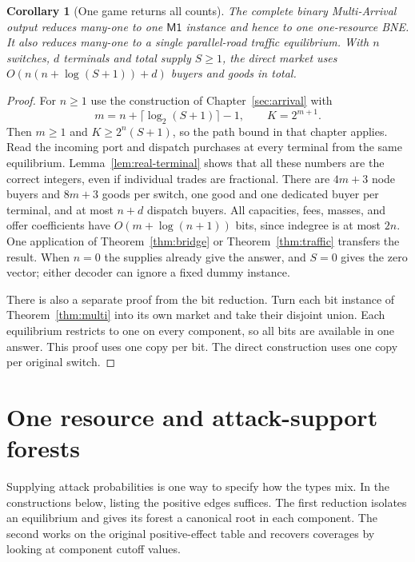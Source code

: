 \documentclass[11pt,oneside,openany,notitlepage]{report}
\newtheorem{corollary}[theorem]{Corollary}
\newcommand{\Market}{\mathsf{M1}}
\begin{document}
\begin{corollary}[One game returns all counts]\label{cor:multi-one}
The complete binary Multi-Arrival output reduces many-one to one
\(\Market\) instance and hence to one one-resource BNE. It also reduces
many-one to a single parallel-road traffic equilibrium. With \(n\)
switches, \(d\) terminals and total supply \(S\ge1\), the direct market
uses \(O(n(n+\log(S+1))+d)\) buyers and goods in total.
\end{corollary}
\begin{proof}
For \(n\ge1\) use the construction of Chapter~\ref{sec:arrival} with
\[
 m=n+\lceil\log_2(S+1)\rceil-1,\qquad K=2^{m+1}.
\]
Then \(m\ge1\) and \(K\ge2^n(S+1)\), so the path bound in that chapter
applies. Read the incoming port and dispatch purchases at every terminal
from the same equilibrium. Lemma~\ref{lem:real-terminal} shows that all
these numbers are the correct integers, even if individual trades are
fractional. There are \(4m+3\) node buyers and \(8m+3\) goods per
switch, one good and one dedicated buyer per terminal, and at most \(n+d\)
dispatch buyers. All capacities, fees, masses, and offer coefficients
have \(O(m+\log(n+1))\) bits, since indegree is at most \(2n\).
One application of Theorem~\ref{thm:bridge} or Theorem~\ref{thm:traffic}
transfers the result. When \(n=0\) the supplies already give the answer,
and \(S=0\) gives the zero vector; either decoder can ignore a fixed
dummy instance.

There is also a separate proof from the bit reduction. Turn each bit
instance of Theorem~\ref{thm:multi} into its own market and take their
disjoint union. Each equilibrium restricts to one on every component,
so all bits are available in one answer. This proof uses one copy per
bit. The direct construction uses one copy per original switch.
\end{proof}

\chapter{One resource and attack-support forests}\label{sec:forests}

Supplying attack probabilities is one way to specify how the types mix.
In the constructions below, listing the positive edges suffices. The
first reduction isolates an equilibrium and gives its forest a canonical
root in each component. The second works on the original positive-effect
table and recovers coverages by looking at component cutoff values.
\end{document}
